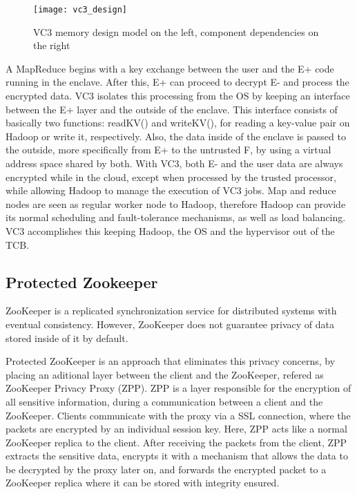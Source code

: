 \begin{figure}[htbp]
	\centering
	{\texttt{[image: vc3\_design]}}%
	\caption{VC3 memory design model on the left, component dependencies on the right}
\end{figure}

A MapReduce begins with a key exchange between the user and the E+ code running in the enclave. After this, E+ can proceed to decrypt E- and process the encrypted data. VC3 isolates this processing from the OS by keeping an interface between the E+ layer and the outside of the enclave. This interface consists of basically two functions: readKV() and writeKV(), for reading a key-value pair on Hadoop or write it, respectively. Also, the data inside of the enclave is passed to the outside, more specifically from E+ to the untrusted F, by using a virtual address space shared by both.
With VC3, both E- and the user data are always encrypted while in the cloud, except when processed by the trusted processor, while allowing Hadoop to manage the execution of VC3 jobs. Map and reduce nodes are seen as regular worker node to Hadoop, therefore Hadoop can provide its normal scheduling and fault-tolerance mechanisms, as well as load balancing. VC3 accomplishes this keeping Hadoop, the OS and the hypervisor out of the TCB.

\subsection{Protected Zookeeper}
\label{ssec:protected_zookeeper}

ZooKeeper \cite{zookeeper} is a replicated synchronization service for distributed systems with eventual consistency. However, ZooKeeper does not guarantee privacy of data stored inside of it by default.

Protected ZooKeeper \cite{protectedZooKeeper} is an approach that eliminates this privacy concerns, by placing an aditional layer between the client and the ZooKeeper, refered as ZooKeeper Privacy Proxy (ZPP). ZPP is a layer responsible for the encryption of all sensitive information, during a communication between a client and the ZooKeeper. 
Clients communicate with the proxy via a SSL connection, where the packets are encrypted by an individual session key. Here, ZPP acts like a normal ZooKeeper replica to the client. 
After receiving the packets from the client, ZPP extracts the sensitive data, encrypts it with a mechanism that allows the data to be decrypted by the proxy later on, and forwards the encrypted packet to a ZooKeeper replica where it can be stored with integrity ensured.

